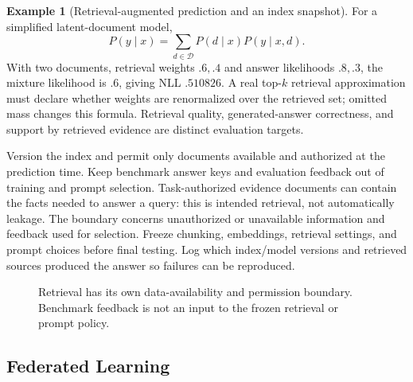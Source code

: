 \documentclass[11pt,twoside]{article}
\numberwithin{equation}{section}
\theoremstyle{plain}
\theoremstyle{definition}
\newtheorem{example}[theorem]{Example}
\theoremstyle{remark}
\begin{document}
\begin{example}[Retrieval-augmented prediction and an index snapshot]
For a simplified latent-document model,
\[
P(y\mid x)=\sum_{d\in\mathcal D}P(d\mid x)P(y\mid x,d).
\]
With two documents, retrieval weights $.6,.4$ and answer likelihoods $.8,.3$,
the mixture likelihood is $.6$, giving NLL $.510826$.
A real top-$k$ retrieval approximation must declare whether weights are
renormalized over the retrieved set; omitted mass changes this formula.
Retrieval quality, generated-answer correctness, and support by retrieved
evidence are distinct evaluation targets.

Version the index and permit only documents available and authorized at the
prediction time. Keep benchmark answer keys and evaluation feedback out of
training and prompt selection. Task-authorized evidence documents can contain
the facts needed to answer a query: this is intended retrieval, not automatically
leakage. The boundary concerns unauthorized or unavailable information and
feedback used for selection. Freeze chunking, embeddings, retrieval settings,
and prompt choices before final testing. Log which index/model versions and
retrieved sources produced the answer so failures can be reproduced.
\end{example}
\begin{figure}[H]\centering
{}
\caption{Retrieval has its own data-availability and permission boundary.
Benchmark feedback is not an input to the frozen retrieval or prompt policy.}
\end{figure}

\subsection{Federated Learning}
\end{document}
